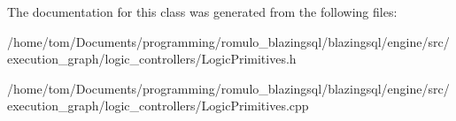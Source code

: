 The documentation for this class was generated from the following files\+:\begin{DoxyCompactItemize}
\item 
/home/tom/\+Documents/programming/romulo\+\_\+blazingsql/blazingsql/engine/src/execution\+\_\+graph/logic\+\_\+controllers/Logic\+Primitives.\+h\item 
/home/tom/\+Documents/programming/romulo\+\_\+blazingsql/blazingsql/engine/src/execution\+\_\+graph/logic\+\_\+controllers/Logic\+Primitives.\+cpp\end{DoxyCompactItemize}
